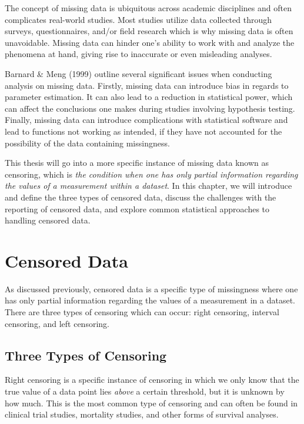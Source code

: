 \documentclass[12pt, twoside]{amherstthesis}
\begin{document}
The concept of missing data is ubiquitous across academic disciplines and often complicates real-world studies. Most studies utilize data collected through surveys, questionnaires, and/or field research which is why missing data is often unavoidable. Missing data can hinder one's ability to work with and analyze the phenomena at hand, giving rise to inaccurate or even misleading analyses.

Barnard \& Meng (1999) outline several significant issues when conducting analysis on missing data. Firstly, missing data can introduce bias in regards to parameter estimation. It can also lead to a reduction in statistical power, which can affect the conclusions one makes during studies involving hypothesis testing. Finally, missing data can introduce complications with statistical software and lead to functions not working as intended, if they have not accounted for the possibility of the data containing missingness.

This thesis will go into a more specific instance of missing data known as censoring, which is \emph{the condition when one has only partial information regarding the values of a measurement within a dataset}. In this chapter, we will introduce and define the three types of censored data, discuss the challenges with the reporting of censored data, and explore common statistical approaches to handling censored data.

\hypertarget{censored_data}{%
\section{Censored Data}\label{censored_data}}

As discussed previously, censored data is a specific type of missingness where one has only partial information regarding the values of a measurement in a dataset. There are three types of censoring which can occur: right censoring, interval censoring, and left censoring.

\hypertarget{right}{%
\subsection{Three Types of Censoring}\label{right}}

Right censoring is a specific instance of censoring in which we only know that the true value of a data point lies \emph{above} a certain threshold, but it is unknown by how much. This is the most common type of censoring and can often be found in clinical trial studies, mortality studies, and other forms of survival analyses.
\end{document}
